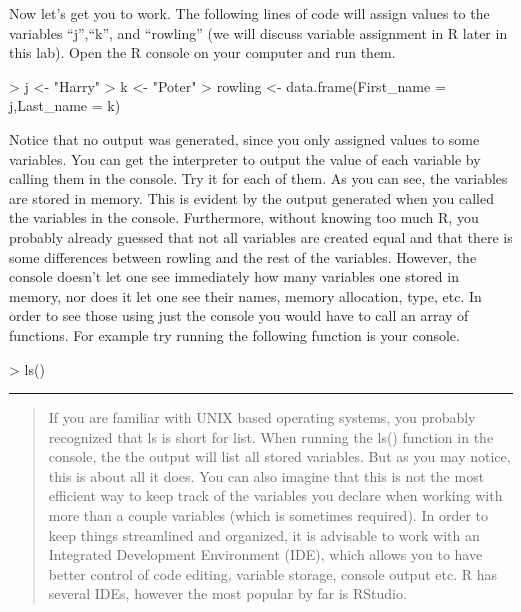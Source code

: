 \documentclass[
]{book}
\newenvironment{Shaded}{\begin{snugshade}}{\end{snugshade}}
\newcommand{\AttributeTok}[1]{\textcolor[rgb]{0.77,0.63,0.00}{#1}}
\newcommand{\FunctionTok}[1]{\textcolor[rgb]{0.00,0.00,0.00}{#1}}
\newcommand{\NormalTok}[1]{#1}
\newcommand{\OtherTok}[1]{\textcolor[rgb]{0.56,0.35,0.01}{#1}}
\newcommand{\SpecialCharTok}[1]{\textcolor[rgb]{0.00,0.00,0.00}{#1}}
\newcommand{\StringTok}[1]{\textcolor[rgb]{0.31,0.60,0.02}{#1}}
\theoremstyle{definition}
\theoremstyle{definition}
\theoremstyle{definition}
\theoremstyle{definition}
\theoremstyle{remark}
\begin{document}
Now let's get you to work. The following lines of code will assign values to the variables ``j'',``k'', and ``rowling'' (we will
discuss variable assignment in R later in this lab).
Open the R console on your computer and run them.

\begin{Shaded}
\begin{Highlighting}[]
\SpecialCharTok{\textgreater{}}\NormalTok{ j }\OtherTok{\textless{}{-}} \StringTok{"Harry"}
\SpecialCharTok{\textgreater{}}\NormalTok{ k }\OtherTok{\textless{}{-}} \StringTok{"Poter"}
\SpecialCharTok{\textgreater{}}\NormalTok{ rowling }\OtherTok{\textless{}{-}} \FunctionTok{data.frame}\NormalTok{(}\AttributeTok{First\_name =}\NormalTok{ j,}\AttributeTok{Last\_name =}\NormalTok{ k)}
\end{Highlighting}
\end{Shaded}

Notice that no output was generated, since you only assigned values to some variables. You can get the interpreter to
output the value of each variable by calling them in the console. Try it for each of them.
As you can see, the variables are stored in memory. This is evident by the output generated when you called the
variables in the console. Furthermore, without knowing too much R, you probably already guessed that not all
variables are created equal and that there is some differences between rowling and the rest of the variables.
However, the console doesn't let one see immediately how many variables one stored in memory, nor does it let one see
their names, memory allocation, type, etc. In order to see those using just the console you would have to call an
array of functions.
For example try running the following function is your console.

\begin{Shaded}
\begin{Highlighting}[]
\SpecialCharTok{\textgreater{}} \FunctionTok{ls}\NormalTok{()}
\end{Highlighting}
\end{Shaded}

\begin{center}\rule{0.5\linewidth}{0.5pt}\end{center}

\begin{quote}
If you are familiar with UNIX based operating systems, you probably recognized that ls is short for list.
When running the ls() function in the console, the the output will list all stored variables. But as you may
notice, this is about all it does. You can also imagine that this is not the most efficient way to keep track of the
variables you declare when working with more than a couple variables (which is sometimes required). In order to keep
things streamlined and organized, it is advisable to work with an Integrated Development Environment (IDE), which
allows you to have better control of code editing, variable storage, console output etc. R has several IDEs, however
the most popular by far is RStudio.
\end{quote}
\end{document}
